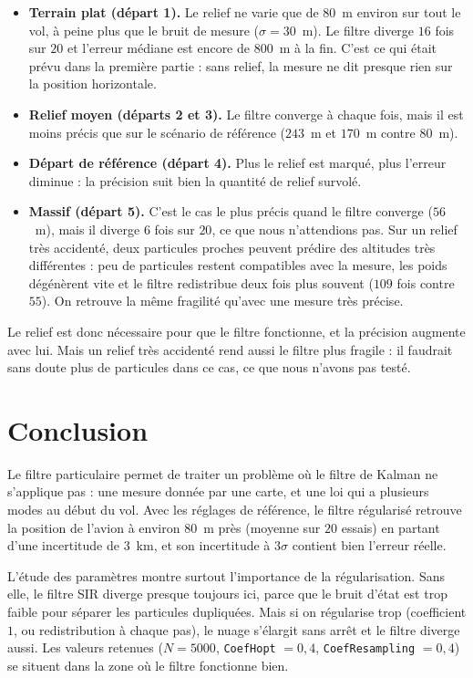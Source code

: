 \documentclass[11pt]{article}
\begin{document}
\begin{itemize}
\item \textbf{Terrain plat (départ 1).} Le relief ne varie que de $80$~m environ sur
tout le vol, à peine plus que le bruit de mesure ($\sigma = 30$~m). Le filtre diverge
$16$ fois sur $20$ et l'erreur médiane est encore de $800$~m à la fin. C'est ce qui
était prévu dans la première partie : sans relief, la mesure ne dit presque rien sur
la position horizontale.
\item \textbf{Relief moyen (départs 2 et 3).} Le filtre converge à chaque fois, mais il
est moins précis que sur le scénario de référence ($243$~m et $170$~m contre $80$~m).
\item \textbf{Départ de référence (départ 4).} Plus le relief est marqué, plus l'erreur
diminue : la précision suit bien la quantité de relief survolé.
\item \textbf{Massif (départ 5).} C'est le cas le plus précis quand le filtre converge
($56$~m), mais il diverge $6$ fois sur $20$, ce que nous n'attendions pas. Sur un
relief très accidenté, deux particules proches peuvent prédire des altitudes très
différentes : peu de particules restent compatibles avec la mesure, les poids
dégénèrent vite et le filtre redistribue deux fois plus souvent ($109$ fois contre
$55$). On retrouve la même fragilité qu'avec une mesure très précise.
\end{itemize}

Le relief est donc nécessaire pour que le filtre fonctionne, et la précision augmente
avec lui. Mais un relief très accidenté rend aussi le filtre plus fragile : il faudrait
sans doute plus de particules dans ce cas, ce que nous n'avons pas testé.

\section*{Conclusion}

Le filtre particulaire permet de traiter un problème où le filtre de Kalman ne
s'applique pas : une mesure donnée par une carte, et une loi qui a plusieurs modes au
début du vol. Avec les réglages de référence, le filtre régularisé retrouve la position
de l'avion à environ $80$~m près (moyenne sur $20$ essais) en partant d'une incertitude de $3$~km,
et son incertitude à $3\sigma$ contient bien l'erreur réelle.

L'étude des paramètres montre surtout l'importance de la régularisation. Sans elle,
le filtre SIR diverge presque toujours ici, parce que le bruit d'état est trop faible
pour séparer les particules dupliquées. Mais si on régularise trop (coefficient $1$,
ou redistribution à chaque pas), le nuage s'élargit sans arrêt et le filtre diverge
aussi. Les valeurs retenues ($N = 5000$, \texttt{CoefHopt} $= 0{,}4$,
\texttt{CoefResampling} $= 0{,}4$) se situent dans la zone où le filtre fonctionne bien.
\end{document}
